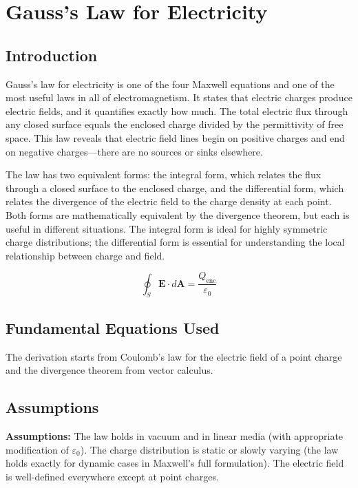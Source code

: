 \chapter{Gauss's Law for Electricity}

\section*{Introduction}

Gauss's law for electricity is one of the four Maxwell equations and one of the most useful laws in all of electromagnetism. It states that electric charges produce electric fields, and it quantifies exactly how much. The total electric flux through any closed surface equals the enclosed charge divided by the permittivity of free space. This law reveals that electric field lines begin on positive charges and end on negative charges---there are no sources or sinks elsewhere.

The law has two equivalent forms: the integral form, which relates the flux through a closed surface to the enclosed charge, and the differential form, which relates the divergence of the electric field to the charge density at each point. Both forms are mathematically equivalent by the divergence theorem, but each is useful in different situations. The integral form is ideal for highly symmetric charge distributions; the differential form is essential for understanding the local relationship between charge and field.

\begin{equation}
\oint_S \mathbf{E} \cdot d\mathbf{A} = \frac{Q_{\text{enc}}}{\varepsilon_0}
\end{equation}

\section*{Fundamental Equations Used}

The derivation starts from Coulomb's law for the electric field of a point charge and the divergence theorem from vector calculus.

\section*{Assumptions}

\textbf{Assumptions:} The law holds in vacuum and in linear media (with appropriate modification of $\varepsilon_0$). The charge distribution is static or slowly varying (the law holds exactly for dynamic cases in Maxwell's full formulation). The electric field is well-defined everywhere except at point charges.


